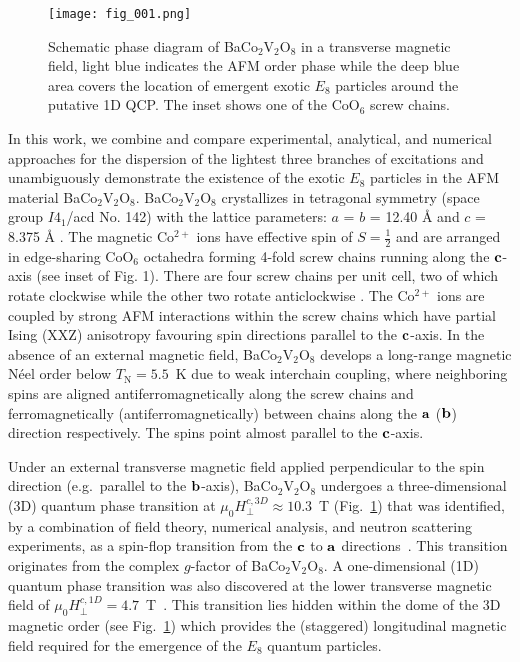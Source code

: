 \documentclass[aps,prl,twocolumn,superscriptaddress,groupedaddress]{revtex4}
\begin{document}
\begin{figure}[t]
\texttt{[image: fig\_001.png]}
\caption{Schematic phase diagram of BaCo$_2$V$_2$O$_8$ in a transverse magnetic field, light blue indicates the AFM order phase while the deep blue area covers the location of emergent exotic $E_8$ particles around the putative 1D QCP. The inset shows one of the CoO$_6$ screw chains.}
\label{fig:plot_phase}
\end{figure}



In this work, we combine and compare experimental, analytical, and numerical approaches for the dispersion of the lightest three branches of excitations and unambiguously demonstrate the existence of the exotic $E_8$ particles in the AFM material BaCo$_2$V$_2$O$_8$. BaCo$_2$V$_2$O$_8$
crystallizes in tetragonal symmetry (space group $I4_1$/acd No. 142) with the lattice parameters: $a$ = $b$ = 12.40 \r{A} and $c$ = 8.375 \r{A} \cite{PhysRevB.87.224413}.
The magnetic Co$^{2+}$ ions have effective spin of $S=\frac{1}{2}$ and are arranged in edge-sharing CoO$_6$ octahedra forming 4-fold screw chains running along the ${\bf c}$-axis
(see inset of Fig. 1).
There are four screw chains per unit cell, two of which rotate clockwise while the other two rotate anticlockwise \cite{PhysRevB.87.054408}. The Co$^{2+}$ ions are coupled by strong AFM interactions within the screw chains which have partial Ising (XXZ) anisotropy favouring spin directions parallel to the ${\bf c}$-axis.
In the absence of an external magnetic field, BaCo$_2$V$_2$O$_8$ develops a long-range magnetic N\'eel order below $T_{\mathrm{N}}=5.5$~K due to weak interchain coupling, where neighboring spins are aligned antiferromagnetically along the screw chains and ferromagnetically (antiferromagnetically) between chains along the ${\bf a}$ (${\bf b}$) direction respectively. The spins point almost parallel to the ${\bf c}$-axis.

Under an external transverse magnetic field applied perpendicular to the spin direction (e.g.\ parallel to the ${\bf b}$-axis), BaCo$_2$V$_2$O$_8$ undergoes a three-dimensional (3D) quantum phase transition at $\mu_0 H_{\bot}^{c,3D} \approx 10.3$~T (Fig.~\ref{fig:plot_phase}) that was identified, by a combination of field theory, numerical analysis, and neutron scattering experiments, as a spin-flop transition from the ${\bf c}$ to ${\bf a}$ directions~\cite{Faure:2017iup}. This transition originates from the complex $g$-factor of BaCo$_2$V$_2$O$_8$. A one-dimensional (1D) quantum phase transition was also discovered at the lower transverse magnetic field of $\mu_0 H_{\bot}^{c,1D}= 4.7$~T~\cite{Weiqiang2019, Zou_2021}. This transition lies hidden within the dome of the 3D magnetic order (see Fig.~\ref{fig:plot_phase}) which provides the (staggered) longitudinal magnetic field required for the emergence of the $E_8$ quantum particles.
\end{document}
